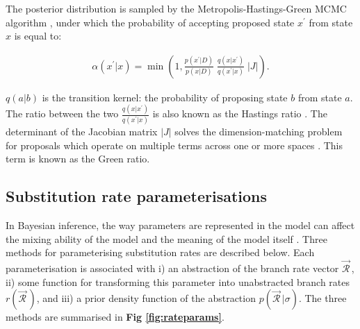 \documentclass[10pt,letterpaper]{article}
\begin{document}
The posterior distribution is sampled by the Metropolis-Hastings-Green MCMC algorithm \cite{metropolis53, hastings70, green1995reversible},
under which the probability of accepting proposed state $x^\prime$ from state $x$ is equal to:

\begin{eqnarray}
\label{eq:MCMC}
\alpha(x^\prime|x) =  \min\left( 1, \frac{p(x^\prime|D)}{p(x|D)} \; \frac{q(x|x^\prime)}{q(x^\prime|x)} \; |J| \right).
\end{eqnarray}

$q(a|b)$ is the transition kernel: the probability of proposing state $b$ from state $a$.
The ratio between the two $\frac{q(x|x^\prime)}{q(x^\prime|x)}$ is also known as the Hastings ratio \cite{hastings70}.
The determinant of the Jacobian matrix $|J|$ solves the dimension-matching problem for proposals which operate on multiple terms across one or more spaces \cite{green1995reversible, geyer2003metropolis}. 
This term is known as the Green ratio. 




\clearpage
\subsection*{Substitution rate parameterisations}
\label{sect:rateparams}

In Bayesian inference, the way parameters are represented in the model can affect the mixing ability of the model and the meaning of the model itself \cite{gelman2004parameterization}. Three methods for parameterising substitution rates are described below.
 Each parameterisation is associated with i) an abstraction of the branch rate vector $\vec{\mathcal{R}}^{\,}$, ii) some function for transforming this parameter into unabstracted branch rates $r(\vec{\mathcal{R}}^{\,})$, and iii) a prior density function of the abstraction $p(\vec{\mathcal{R}}^{\,} | \sigma) $. 
 The three methods are summarised in \textbf{Fig \ref{fig:rateparams}}.
\end{document}
